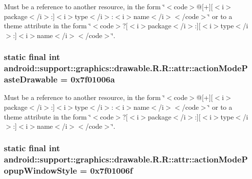 Must be a reference to another resource, in the form \char`\"{}$<$code$>$@\mbox{[}+\mbox{]}\mbox{[}$<$i$>$package$<$/i$>$:\mbox{]}$<$i$>$type$<$/i$>$:$<$i$>$name$<$/i$>$$<$/code$>$\char`\"{} or to a theme attribute in the form \char`\"{}$<$code$>$?\mbox{[}$<$i$>$package$<$/i$>$:\mbox{]}\mbox{[}$<$i$>$type$<$/i$>$:\mbox{]}$<$i$>$name$<$/i$>$$<$/code$>$\char`\"{}. \hypertarget{classandroid_1_1support_1_1graphics_1_1drawable_1_1_r_1_1attr_a848c85aa9d95dd0350838960df2a3a1}{
\subsubsection[{actionModePasteDrawable}]{\setlength{\rightskip}{0pt plus 5cm}static final int android::support::graphics::drawable.R.R::attr::actionModePasteDrawable = 0x7f01006a}}
\label{classandroid_1_1support_1_1graphics_1_1drawable_1_1_r_1_1attr_a848c85aa9d95dd0350838960df2a3a1}


Must be a reference to another resource, in the form \char`\"{}$<$code$>$@\mbox{[}+\mbox{]}\mbox{[}$<$i$>$package$<$/i$>$:\mbox{]}$<$i$>$type$<$/i$>$:$<$i$>$name$<$/i$>$$<$/code$>$\char`\"{} or to a theme attribute in the form \char`\"{}$<$code$>$?\mbox{[}$<$i$>$package$<$/i$>$:\mbox{]}\mbox{[}$<$i$>$type$<$/i$>$:\mbox{]}$<$i$>$name$<$/i$>$$<$/code$>$\char`\"{}. \hypertarget{classandroid_1_1support_1_1graphics_1_1drawable_1_1_r_1_1attr_2c1b5855e844733ff5e1e6984a921326}{
\subsubsection[{actionModePopupWindowStyle}]{\setlength{\rightskip}{0pt plus 5cm}static final int android::support::graphics::drawable.R.R::attr::actionModePopupWindowStyle = 0x7f01006f}}
\label{classandroid_1_1support_1_1graphics_1_1drawable_1_1_r_1_1attr_2c1b5855e844733ff5e1e6984a921326}



